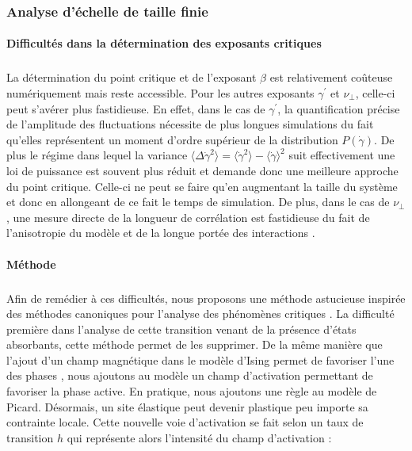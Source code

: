 \subsubsection{Analyse d'échelle de taille finie}

\paragraph{Difficultés dans la détermination des exposants critiques}

\subparagraph{}La détermination du point critique et de l'exposant $\beta$ est relativement coûteuse numériquement mais reste accessible. Pour les autres exposants $\gamma^\prime$ et $\nu_\perp$, celle-ci peut s'avérer plus fastidieuse. En effet, dans le cas de $\gamma^\prime$, la quantification précise de l'amplitude des fluctuations nécessite de plus longues simulations du fait qu'elles représentent un moment d'ordre supérieur de la distribution $P(\dot{\gamma})$. De plus le régime dans lequel la variance $\langle\Delta\dot{\gamma}^2\rangle = \langle \dot{\gamma}^2\rangle - \langle \dot{\gamma}\rangle^2$ suit effectivement une loi de puissance est souvent plus réduit et demande donc une meilleure approche du point critique. Celle-ci ne peut se faire qu'en augmentant la taille du système et donc en allongeant de ce fait le temps de simulation. De plus, dans le cas de $\nu_\perp$, une mesure directe de la longueur de corrélation est fastidieuse du fait de l'anisotropie du modèle et de la longue portée des interactions \cite{liu_critical_2016}.

\paragraph{Méthode}

\label{sec:methodeFSS}

\subparagraph{}Afin de remédier à ces difficultés, nous proposons une méthode astucieuse inspirée des méthodes canoniques pour l'analyse des phénomènes critiques \cite{lubeck_universal_2004}. La difficulté première dans l'analyse de cette transition venant de la présence d'états absorbants, cette méthode permet de les supprimer. De la même manière que l'ajout d'un champ magnétique dans le modèle d'Ising permet de favoriser l'une des phases \cite{kardar_statistical_2007}, nous ajoutons au modèle un champ d'activation permettant de favoriser la phase active. En pratique, nous ajoutons une règle au modèle de Picard. Désormais, un site élastique peut devenir plastique peu importe sa contrainte locale. Cette nouvelle voie d'activation se fait selon un taux de transition $h$ qui représente alors l'intensité du champ d'activation :

